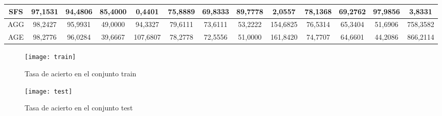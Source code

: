 \documentclass[12pt]{article}
\begin{document}
\begin{table}[H]
{\begin{tabular}{|c|cccc|cccc|cccc|}
SFS  & \multicolumn{1}{c|}{97,1531}                                                  & \multicolumn{1}{c|}{94,4806}                                                 & \multicolumn{1}{c|}{85,4000} & 0,4401   & \multicolumn{1}{c|}{75,8889}                                                  & \multicolumn{1}{c|}{69,8333}                                                 & \multicolumn{1}{c|}{89,7778} & 2,0557   & \multicolumn{1}{c|}{78,1368}                                                  & \multicolumn{1}{c|}{69,2762}                                                 & \multicolumn{1}{c|}{97,9856} & 3,8331   \\ \hline
AGG  & \multicolumn{1}{c|}{98,2427}                                                  & \multicolumn{1}{c|}{95,9931}                                                 & \multicolumn{1}{c|}{49,0000} & 94,3327  & \multicolumn{1}{c|}{79,6111}                                                  & \multicolumn{1}{c|}{73,6111}                                                 & \multicolumn{1}{c|}{53,2222} & 154,6825 & \multicolumn{1}{c|}{76,5314}                                                  & \multicolumn{1}{c|}{65,3404}                                                 & \multicolumn{1}{c|}{51,6906} & 758,3582 \\ \hline
AGE  & \multicolumn{1}{c|}{98,2776}                                                  & \multicolumn{1}{c|}{96,0284}                                                 & \multicolumn{1}{c|}{39,6667} & 107,6807 & \multicolumn{1}{c|}{78,2778}                                                  & \multicolumn{1}{c|}{72,5556}                                                 & \multicolumn{1}{c|}{51,0000} & 161,8420 & \multicolumn{1}{c|}{74,7707}                                                  & \multicolumn{1}{c|}{64,6601}                                                 & \multicolumn{1}{c|}{44,2086} & 866,2114 \\ \hline
\end{tabular}}
\end{table}


\begin{figure}[H]
\centering
\texttt{[image: train]}
\caption{Tasa de acierto en el conjunto train} \label{fig:train}
\end{figure}

\begin{figure}[H]
\centering
\texttt{[image: test]}
\caption{Tasa de acierto en el conjunto test} \label{fig:test}
\end{figure}
\end{document}
